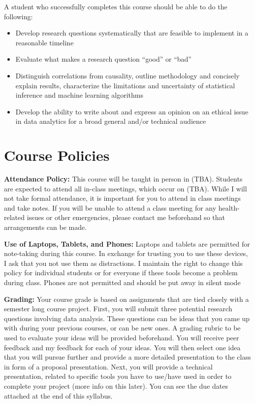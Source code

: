 \documentclass[11pt,letter]{article}
\begin{document}
A student who successfully completes this course should be able to do the following:
\begin{itemize}[nosep]
\item Develop research questions systematically that are feasible to implement in a reasonable timeline
\item Evaluate what makes a research question ``good'' or ``bad''
\item Distinguish correlations from causality, outline methodology and concisely explain results, characterize the limitations and uncertainty of statistical inference and machine learning algorithms
\item Develop the ability to write about and express an opinion on an ethical issue in data analytics for a broad general and/or technical audience
\end{itemize}


\section*{Course Policies}
\textbf{Attendance Policy:} This course will be taught in person in (TBA). Students are expected to attend all in-class meetings, which occur on (TBA). While I will not take formal attendance, it is important for you to attend in class meetings and take notes. If you will be unable to attend a class meeting for any health-related issues or other emergencies, please contact me beforehand so that arrangements can be made.

\textbf{Use of Laptops, Tablets, and Phones:}  Laptops and tablets are permitted for note-taking during this course. In exchange for trusting you to use these devices, I ask that you not use them as distractions. I maintain the right to change this policy for individual students or for everyone if these tools become a problem during class. Phones are not permitted and should be put away in silent mode

\textbf{Grading:} Your course grade is based on assignments that are tied closely with a semester long course project. First, you will submit three potential research questions involving data analysis. These questions can be ideas that you came up with during your previous courses, or can be new ones. A grading rubric to be used to evaluate your ideas will be provided beforehand. You will receive peer feedback and my feedback for each of your ideas. You will then select one idea that you will pursue further and provide a more detailed presentation to the class in form of a proposal presentation. Next, you will provide a technical presentation, related to specific tools you have to use/have used in order to complete your project (more info on this later). You can see the due dates attached at the end of this syllabus.
\end{document}
